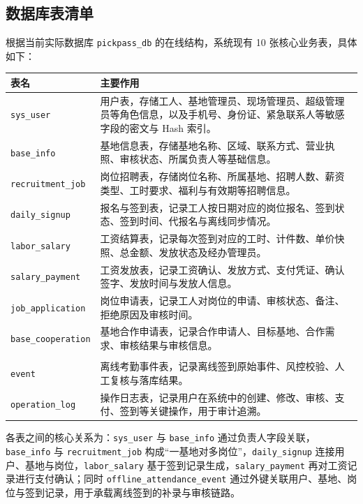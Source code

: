 \documentclass[UTF8,a4paper,fontset=none]{ctexart}
\begin{document}
\subsection{数据库表清单}
根据当前实际数据库 \texttt{pickpass\_db} 的在线结构，系统现有 10 张核心业务表，具体如下：

\begin{tabular}{p{4.2cm}p{9.3cm}}
\toprule
表名 & 主要作用 \\
\midrule
\texttt{sys\_user} & 用户表，存储工人、基地管理员、现场管理员、超级管理员等角色信息，以及手机号、身份证、紧急联系人等敏感字段的密文与 Hash 索引。 \\
\texttt{base\_info} & 基地信息表，存储基地名称、区域、联系方式、营业执照、审核状态、所属负责人等基础信息。 \\
\texttt{recruitment\_job} & 岗位招聘表，存储岗位名称、所属基地、招聘人数、薪资类型、工时要求、福利与有效期等招聘信息。 \\
\texttt{daily\_signup} & 报名与签到表，记录工人按日期对应的岗位报名、签到状态、签到时间、代报名与离线同步情况。 \\
\texttt{labor\_salary} & 工资结算表，记录每次签到对应的工时、计件数、单价快照、总金额、发放状态及经办管理员。 \\
\texttt{salary\_payment} & 工资发放表，记录工资确认、发放方式、支付凭证、确认签字、发放时间与发放人信息。 \\
\texttt{job\_application} & 岗位申请表，记录工人对岗位的申请、审核状态、备注、拒绝原因及审核时间。 \\
\texttt{base\_cooperation} & 基地合作申请表，记录合作申请人、目标基地、合作需求、审核结果与审核信息。 \\
\shortstack[l]{\texttt{offline\_attendance\_}\\\texttt{event}} & 离线考勤事件表，记录离线签到原始事件、风控校验、人工复核与落库结果。 \\
\texttt{operation\_log} & 操作日志表，记录用户在系统中的创建、修改、审核、支付、签到等关键操作，用于审计追溯。 \\
\bottomrule
\end{tabular}

各表之间的核心关系为：\texttt{sys\_user} 与 \texttt{base\_info} 通过负责人字段关联，\texttt{base\_info} 与 \texttt{recruitment\_job} 构成“一基地对多岗位”，\texttt{daily\_signup} 连接用户、基地与岗位，\texttt{labor\_salary} 基于签到记录生成，\texttt{salary\_payment} 再对工资记录进行支付确认；同时 \texttt{offline\_attendance\_event} 通过外键关联用户、基地、岗位与签到记录，用于承载离线签到的补录与审核链路。
\end{document}
